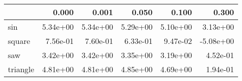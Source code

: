 \begin{tabular}{lrrrrr}
\toprule
{} &    0.000 &    0.001 &    0.050 &    0.100 &     0.300 \\
\midrule
sin      & 5.34e+00 & 5.34e+00 & 5.29e+00 & 5.10e+00 &  3.13e+00 \\
square   & 7.56e-01 & 7.60e-01 & 6.33e-01 & 9.47e-02 & -5.08e+00 \\
saw      & 3.42e+00 & 3.42e+00 & 3.35e+00 & 3.19e+00 &  4.52e-01 \\
triangle & 4.81e+00 & 4.81e+00 & 4.85e+00 & 4.69e+00 &  1.94e-01 \\
\bottomrule
\end{tabular}

